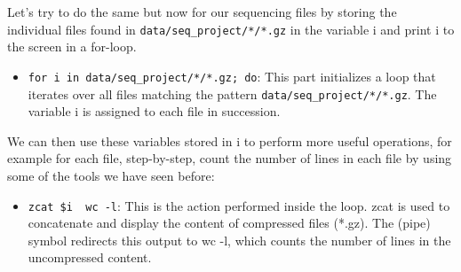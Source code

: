 \documentclass[
  letterpaper,
  DIV=11,
  numbers=noendperiod]{scrreprt}
\newenvironment{Shaded}{}{}
\newcommand{\AttributeTok}[1]{\textcolor[rgb]{0.84,0.23,0.29}{#1}}
\newcommand{\BuiltInTok}[1]{\textcolor[rgb]{0.84,0.23,0.29}{#1}}
\newcommand{\ControlFlowTok}[1]{\textcolor[rgb]{0.84,0.23,0.29}{#1}}
\newcommand{\FunctionTok}[1]{\textcolor[rgb]{0.44,0.26,0.76}{#1}}
\newcommand{\KeywordTok}[1]{\textcolor[rgb]{0.84,0.23,0.29}{#1}}
\newcommand{\NormalTok}[1]{\textcolor[rgb]{0.14,0.16,0.18}{#1}}
\newcommand{\PreprocessorTok}[1]{\textcolor[rgb]{0.84,0.23,0.29}{#1}}
\newcommand{\StringTok}[1]{\textcolor[rgb]{0.01,0.18,0.38}{#1}}
\newcommand{\VariableTok}[1]{\textcolor[rgb]{0.89,0.38,0.04}{#1}}
\providecommand{\tightlist}{%
  \setlength{\itemsep}{0pt}\setlength{\parskip}{0pt}}\usepackage{longtable,booktabs,array}
\begin{document}
Let's try to do the same but now for our sequencing files by storing the
individual files found in \texttt{data/seq\_project/*/*.gz} in the
variable i and print i to the screen in a for-loop.

\begin{Shaded}
\end{Shaded}

\begin{itemize}
\tightlist
\item
  \texttt{for\ i\ in\ data/seq\_project/*/*.gz;\ do}: This part
  initializes a loop that iterates over all files matching the pattern
  \texttt{data/seq\_project/*/*.gz}. The variable i is assigned to each
  file in succession.
\end{itemize}

We can then use these variables stored in i to perform more useful
operations, for example for each file, step-by-step, count the number of
lines in each file by using some of the tools we have seen before:

\begin{Shaded}
\end{Shaded}

\begin{itemize}
\tightlist
\item
  \texttt{zcat\ \$i\ \textbar{}\ wc\ -l}: This is the action performed
  inside the loop. zcat is used to concatenate and display the content
  of compressed files (*.gz). The \textbar{} (pipe) symbol redirects
  this output to wc -l, which counts the number of lines in the
  uncompressed content.
\end{itemize}
\end{document}
